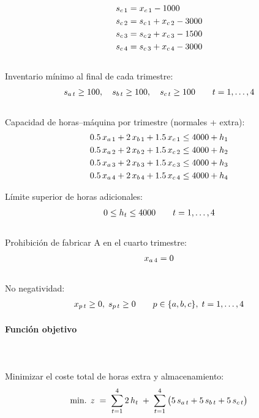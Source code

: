 \begin{align}
s_{c\,1} &= x_{c\,1} - 1000 \notag\\
s_{c\,2} &= s_{c\,1} + x_{c\,2} - 3000 \notag\\
s_{c\,3} &= s_{c\,2} + x_{c\,3} - 1500 \notag\\
s_{c\,4} &= s_{c\,3} + x_{c\,4} - 3000 \notag
\end{align}
\\
Inventario mínimo al final de cada trimestre:
\begin{align}
s_{a\,t} \ge 100,\quad s_{b\,t} \ge 100,\quad s_{c\,t} \ge 100 \qquad t=1,\dots,4 \notag
\end{align}
\\
Capacidad de horas--máquina por trimestre (normales + extra):
\begin{align}
0.5\,x_{a\,1} + 2\,x_{b\,1} + 1.5\,x_{c\,1} &\le 4000 + h_1 \notag\\
0.5\,x_{a\,2} + 2\,x_{b\,2} + 1.5\,x_{c\,2} &\le 4000 + h_2 \notag\\
0.5\,x_{a\,3} + 2\,x_{b\,3} + 1.5\,x_{c\,3} &\le 4000 + h_3 \notag\\
0.5\,x_{a\,4} + 2\,x_{b\,4} + 1.5\,x_{c\,4} &\le 4000 + h_4 \notag
\end{align}

Límite superior de horas adicionales:
\begin{align}
0 \le h_t \le 4000 \qquad t=1,\dots,4 \notag
\end{align}
\\
Prohibición de fabricar A en el cuarto trimestre:
\begin{align}
x_{a\,4} = 0 \notag
\end{align}
\\
No negatividad:
\begin{align}
x_{p\,t}\ge 0,\; s_{p\,t}\ge 0 \qquad p\in\{a,b,c\},\; t=1,\dots,4 \notag
\end{align}

\paragraph{Función objetivo}\mbox{}\\
\\
Minimizar el coste total de horas extra y almacenamiento:
\begin{align}
\mbox{min. } z \;=\; \sum_{t=1}^{4} 2\,h_t \;+\; \sum_{t=1}^{4}\big(5\,s_{a\,t} + 5\,s_{b\,t} + 5\,s_{c\,t}\big) \notag
\end{align}

